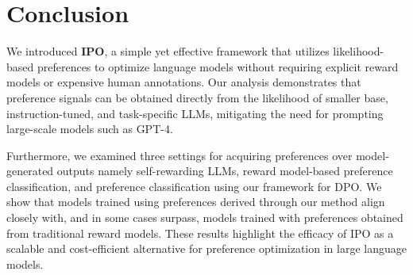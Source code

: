 \section{Conclusion}
We introduced \textbf{IPO}, a simple yet effective framework that utilizes likelihood-based preferences to optimize language models without requiring explicit reward models or expensive human annotations. Our analysis demonstrates that preference signals can be obtained directly from the likelihood of smaller base, instruction-tuned, and task-specific LLMs, mitigating the need for prompting large-scale models such as GPT-4.

Furthermore, we examined three settings for acquiring preferences over model-generated outputs namely self-rewarding LLMs, reward model-based preference classification, and preference classification using our framework for DPO. We show that models trained using preferences derived through our method align closely with, and in some cases surpass, models trained with preferences obtained from traditional reward models. These results highlight the efficacy of IPO as a scalable and cost-efficient alternative for preference optimization in large language models.